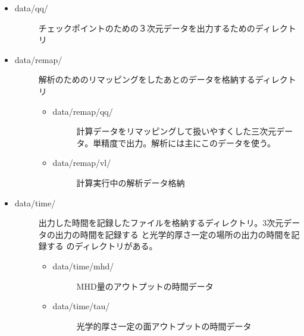 \documentclass[letterpaper,10pt,dvipdfmx,report]{sphinxmanual}
\begin{document}
\begin{itemize}
\begin{description}
\begin{itemize}
\begin{description}
\end{description}

\item {} \begin{description}
\item[{data/qq/}] \leavevmode
チェックポイントのための３次元データを出力するためのディレクトリ

\end{description}

\item {} \begin{description}
\item[{data/remap/}] \leavevmode
解析のためのリマッピングをしたあとのデータを格納するディレクトリ
\begin{itemize}
\item {} \begin{description}
\item[{data/remap/qq/}] \leavevmode
計算データをリマッピングして扱いやすくした三次元データ。単精度で出力。解析には主にこのデータを使う。

\end{description}

\item {} \begin{description}
\item[{data/remap/vl/}] \leavevmode
計算実行中の解析データ格納

\end{description}

\end{itemize}

\end{description}

\item {} \begin{description}
\item[{data/time/}] \leavevmode
出力した時間を記録したファイルを格納するディレクトリ。3次元データの出力の時間を記録する  と光学的厚さ一定の場所の出力の時間を記録する  のディレクトリがある。
\begin{itemize}
\item {} \begin{description}
\item[{data/time/mhd/}] \leavevmode
MHD量のアウトプットの時間データ

\end{description}

\item {} \begin{description}
\item[{data/time/tau/}] \leavevmode
光学的厚さ一定の面アウトプットの時間データ


\end{description}
\end{itemize}
\end{description}
\end{itemize}
\end{description}
\end{itemize}
\end{document}
